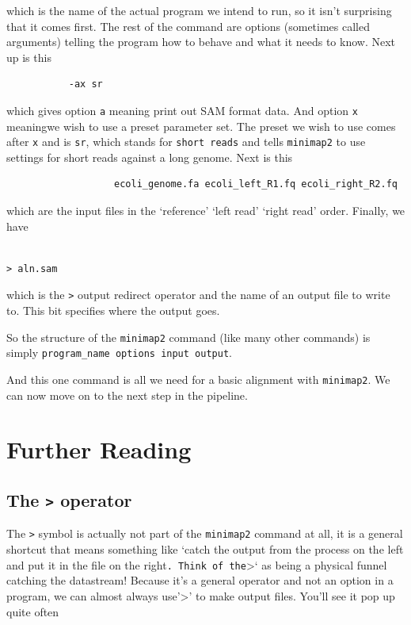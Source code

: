 \documentclass[]{book}
\begin{document}
which is the name of the actual program we intend to run, so it isn't surprising that it comes first. The rest of the command are options (sometimes called arguments) telling the program how to behave and what it needs to know. Next up is this

\begin{verbatim}
           -ax sr
\end{verbatim}

which gives option \texttt{a} meaning print out SAM format data. And option \texttt{x} meaningwe wish to use a preset parameter set. The preset we wish to use comes after \texttt{x} and is \texttt{sr}, which stands for \texttt{short\ reads} and tells \texttt{minimap2} to use settings for short reads against a long genome. Next is this

\begin{verbatim}
                   ecoli_genome.fa ecoli_left_R1.fq ecoli_right_R2.fq
\end{verbatim}

which are the input files in the `reference' `left read' `right read' order. Finally, we have

\begin{verbatim}
                                                                       > aln.sam
\end{verbatim}

which is the \texttt{\textgreater{}} output redirect operator and the name of an output file to write to. This bit specifies where the output goes.

So the structure of the \texttt{minimap2} command (like many other commands) is simply \texttt{program\_name\ options\ input\ output}.

And this one command is all we need for a basic alignment with \texttt{minimap2}. We can now move on to the next step in the pipeline.

\hypertarget{further-reading}{%
\section{Further Reading}\label{further-reading}}

\hypertarget{the-operator}{%
\subsection{\texorpdfstring{The \texttt{\textgreater{}} operator}{The \textgreater{} operator}}\label{the-operator}}

The \texttt{\textgreater{}} symbol is actually not part of the \texttt{minimap2} command at all, it is a general shortcut that means something like `catch the output from the process on the left and put it in the file on the right\texttt{.\ Think\ of\ the}\textgreater{}` as being a physical funnel catching the datastream! Because it's a general operator and not an option in a program, we can almost always use'\textgreater{}' to make output files. You'll see it pop up quite often
\end{document}
